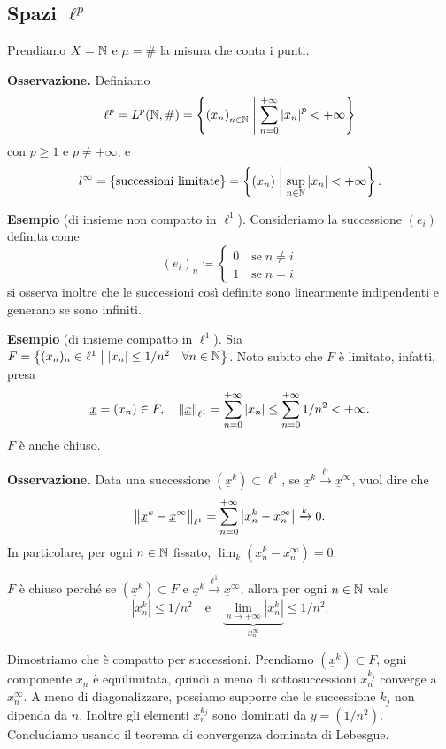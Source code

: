 \subsection{Spazi $\ell^p$}

Prendiamo $X = \mathbb N$ e $\mu = \#$ la misura che conta i punti.

\textbf{Osservazione.} Definiamo
%
$$
\ell^p = L^p(\mathbb N, \#) = \left\{ \left( x_n \right)_{n \in \mathbb N} \;\middle|\; \sum_{n=0}^{+\infty} \left| x_n \right|^p < +\infty  \right\}
$$
con $p \geq 1$ e $p \neq +\infty$, e
%
$$
l^{\infty} = \left\{ \text{successioni limitate} \right\} = \left\{ \left( x_n \right) \;\middle|\; \sup_{n \in \mathbb N}\left| x_n \right| < +\infty \right\}.
$$
%

\textbf{Esempio} (di insieme non compatto in $\ell^1$). Consideriamo la successione $\left( e_i \right)$ definita come
%
$$
(e_i)_n \coloneqq 
\begin{cases}
0 \quad \text{se} \; n \neq i \\
1 \quad \text{se} \; n = i
\end{cases} 
$$
%
si osserva inoltre che le successioni così definite sono linearmente indipendenti e generano se sono infiniti.

\textbf{Esempio} (di insieme compatto in $\ell^1$). Sia $F = \left\{ (x_n)_n \in \ell^1 \;\middle|\; \left| x_n \right| \leq 1 / n^2 \quad \forall n \in \mathbb N \right\}$.
Noto subito che $F$ è limitato, infatti, presa
%
$$
\underline{x} = (x_n) \in F, \quad  \left\lVert \underline{x} \right\rVert_{\ell^1} = \sum_{n=0}^{+\infty} \left| x_n \right| \leq
\sum_{n=0}^{+\infty} 1 / n^2 < +\infty.  
$$
%
$F$ è anche chiuso.

\textbf{Osservazione.} Data una successione $(\underline{x}^k) \subset \ell^1$, se $\underline{x}^k \xrightarrow{\ell^1} \underline{x}^{\infty}$, vuol dire che
%
$$
\left\lVert \underline{x}^k - \underline{x}^\infty \right\rVert_{\ell^1} = \sum_{n = 0}^{+\infty}  \left| x_n^k - x_n^\infty \right| \xrightarrow{k} 0. 
$$
%
In particolare, per ogni $n \in \mathbb N$ fissato, $\lim_k (x_n^k - x_n^\infty) = 0$.

$F$ è chiuso perché se $(\underline{x}^k) \subset F$ e $\underline{x}^k \xrightarrow{\ell^1} \underline{x}^\infty$, allora per ogni $n \in \mathbb N$ vale 
%
$$
\left| x_n^k \right| \leq 1 / n^2 \quad \text{e} \quad \underbrace{\lim_{n \to +\infty} \left| x_n^k  \right|}_{x_n^\infty} \leq 1/n^2.
$$
%

Dimostriamo che è compatto per successioni.
Prendiamo $( \underline{x}^k ) \subset F$, ogni componente $x_n$ è equilimitata, quindi a meno di sottosuccessioni $x_n^{k_j}$ converge a $x_n^\infty$.
A meno di diagonalizzare, possiamo supporre che le successione $k_j$ non dipenda da $n$.
Inoltre gli elementi $x_n^{k_j}$ sono dominati da $y = (1 / n^2)$. Concludiamo usando il teorema di convergenza dominata di Lebesgue.


